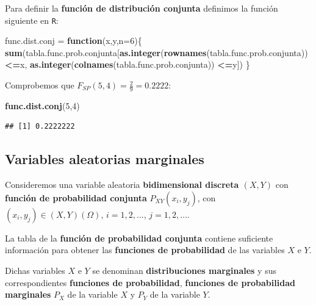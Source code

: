 \documentclass[]{book}
\newenvironment{Shaded}{\begin{snugshade}}{\end{snugshade}}
\newcommand{\ControlFlowTok}[1]{\textcolor[rgb]{0.13,0.29,0.53}{\textbf{#1}}}
\newcommand{\DataTypeTok}[1]{\textcolor[rgb]{0.13,0.29,0.53}{#1}}
\newcommand{\DecValTok}[1]{\textcolor[rgb]{0.00,0.00,0.81}{#1}}
\newcommand{\KeywordTok}[1]{\textcolor[rgb]{0.13,0.29,0.53}{\textbf{#1}}}
\newcommand{\NormalTok}[1]{#1}
\newcommand{\OperatorTok}[1]{\textcolor[rgb]{0.81,0.36,0.00}{\textbf{#1}}}
\newcommand{\StringTok}[1]{\textcolor[rgb]{0.31,0.60,0.02}{#1}}
\begin{document}
Para definir la \textbf{función de distribución conjunta} definimos la función siguiente en \texttt{R}:

\begin{Shaded}
\begin{Highlighting}[]
\NormalTok{func.dist.conj =}\StringTok{ }\ControlFlowTok{function}\NormalTok{(x,y,}\DataTypeTok{n=}\DecValTok{6}\NormalTok{)\{}
  \KeywordTok{sum}\NormalTok{(tabla.func.prob.conjunta[}\KeywordTok{as.integer}\NormalTok{(}\KeywordTok{rownames}\NormalTok{(tabla.func.prob.conjunta))}\OperatorTok{<=}\NormalTok{x,}
                            \KeywordTok{as.integer}\NormalTok{(}\KeywordTok{colnames}\NormalTok{(tabla.func.prob.conjunta)) }\OperatorTok{<=}\NormalTok{y])}
\NormalTok{\}}
\end{Highlighting}
\end{Shaded}

Comprobemos que \(F_{SP}(5,4)=\frac{2}{9}=0.2222\):

\begin{Shaded}
\begin{Highlighting}[]
\KeywordTok{func.dist.conj}\NormalTok{(}\DecValTok{5}\NormalTok{,}\DecValTok{4}\NormalTok{)}
\end{Highlighting}
\end{Shaded}

\begin{verbatim}
## [1] 0.2222222
\end{verbatim}

\hypertarget{variables-aleatorias-marginales}{%
\subsection{Variables aleatorias marginales}\label{variables-aleatorias-marginales}}

Consideremos una variable aleatoria \textbf{bidimensional discreta \((X,Y)\)} con \textbf{función de probabilidad conjunta} \(P_{XY}(x_i,y_j)\), con \((x_i,y_j)\in (X,Y)(\Omega)\), \(i=1,2,\ldots\), \(j=1,2,\ldots\).

La tabla de la \textbf{función de probabilidad conjunta} contiene suficiente información para obtener las \textbf{funciones de probabilidad} de las variables \(X\) e \(Y\).

Dichas variables \(X\) e \(Y\) se denominan \textbf{distribuciones marginales} y sus correspondientes \textbf{funciones de probabilidad}, \textbf{funciones de probabilidad marginales} \(P_X\) de la variable \(X\) y \(P_Y\) de la variable \(Y\).
\end{document}
